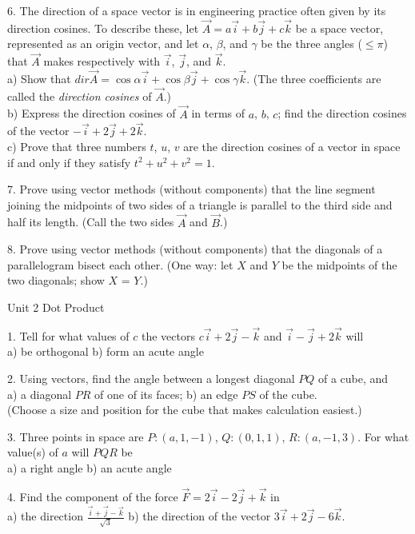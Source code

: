 \documentclass{article}
\begin{document}
6. The direction of a space vector is in engineering practice often given by
its direction cosines. To describe these, let $\vec{A} = a \vec{i} + b \vec{j}
+ c \vec{k}$ be a space vector, represented as an origin vector, and let
$\alpha$, $\beta$, and $\gamma$ be the three angles ($\le \pi$) that $\vec{A}$
makes respectively with $\vec{i}$, $\vec{j}$, and $\vec{k}$.\\
a) Show that $dir \vec{A} = \cos\alpha \vec{i} + \cos\beta \vec{j} +
\cos\gamma \vec{k}$. (The three coefficients are called the \emph{direction
cosines} of $\vec{A}$.)\\
b) Express the direction cosines of $\vec{A}$ in terms of $a$, $b$, $c$; find
the direction cosines of the vector $-\vec{i} + 2\vec{j} + 2\vec{k}$.\\
c) Prove that three numbers $t$, $u$, $v$ are the direction cosines of a vector
in space if and only if they satisfy $t^{2} + u^{2} + v^{2} = 1$.

7. Prove using vector methods (without components) that the line segment
joining the midpoints of two sides of a triangle is parallel to the third side
and half its length. (Call the two sides $\vec{A}$ and $\vec{B}$.)

8. Prove using vector methods (without components) that the diagonals of a
parallelogram bisect each other. (One way: let $X$ and $Y$ be the midpoints of
the two diagonals; show $X$ = $Y$.)

\bigskip

Unit 2 Dot Product

1. Tell for what values of $c$ the vectors $c \vec{i} + 2 \vec{j} - \vec{k}$
and $\vec{i} - \vec{j} + 2 \vec{k}$ will\\
a) be orthogonal \hspace{10px} b) form an acute angle

2. Using vectors, find the angle between a longest diagonal $PQ$ of a cube,
and\\
a) a diagonal $PR$ of one of its faces; \hspace{10px} b) an edge $PS$ of the
cube.\\
(Choose a size and position for the cube that makes calculation easiest.)

3. Three points in space are $P:(a,1,-1)$, $Q:(0,1,1)$, $R:(a,-1,3)$. For what
value(s) of $a$ will $PQR$ be\\
a) a right angle \hspace{10px} b) an acute angle

4. Find the component of the force $\vec{F} = 2 \vec{i} - 2 \vec{j} + \vec{k}$
in\\
a) the direction $\frac{\vec{i} + \vec{j} - \vec{k}}{\sqrt{3}}$ \hspace{10px}
b) the direction of the vector $3 \vec{i} + 2 \vec{j} - 6 \vec{k}$.
\end{document}
